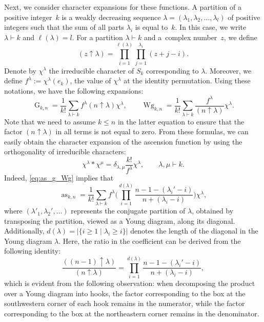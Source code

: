\documentclass[pdftex]{sigma}
\numberwithin{equation}{section}
\theoremstyle{definition}
\DeclareMathOperator{\Raise}{as}
\DeclareMathOperator{\G}{G}
\DeclareMathOperator{\Wg}{Wg}
\begin{document}
Next, we consider character expansions for these functions.
A partition of a positive integer~$k$ is a weakly decreasing sequence
$\lambda=(\lambda_1,\lambda_2,\dots,\lambda_l)$ of positive integers
such that the sum of all parts $\lambda_i$ is equal to~$k$.
In this case, we write $\lambda \vdash k$
and $\ell(\lambda)=l$.
For a partition $\lambda \vdash k$ and a~complex number~$z$, we define
\[
(z\uparrow \lambda)= \prod_{i=1}^{\ell(\lambda)} \prod_{j=1}^{\lambda_i} (z+j-i).
\]
Denote by $\chi^\lambda$ the irreducible character of $S_k$ corresponding to $\lambda$.
Moreover, we define $f^\lambda :=\chi^\lambda(e_k)$,
the value of $\chi^\lambda$ at the identity permutation.
Using these notations, we have the following expansions:
\begin{equation} \label{eq:Wg_char}
 \G_{k,n} = \frac{1}{k!} \sum_{\lambda \vdash k} f^\lambda (n \uparrow \lambda) \chi^\lambda,
\qquad
\Wg_{k,n} = \frac{1}{k!} \sum_{\lambda \vdash k} \frac{f^\lambda}{(n \uparrow \lambda)} \chi^\lambda.
\end{equation}
Note that we need to assume $k \le n$ in the latter equation
to ensure that the factor $(n \uparrow \lambda)$ in all terms is not equal to zero.
From these formulas, we can easily obtain the character expansion of the ascension function by using the orthogonality of irreducible characters:
\[
\chi^\lambda * \chi^\mu = \delta_{\lambda,\mu} \frac{k!}{f^\lambda} \chi^\lambda, \qquad \lambda,\mu \vdash k.
\]
Indeed, \eqref{eq:as_g_Wg} implies that
\begin{equation*} %
 \Raise_{k,n} = \frac{1}{k!} \sum_{\lambda \vdash k} f^\lambda
 \Biggl( \prod_{i=1}^{d(\lambda)} \frac{n-1-(\lambda_i'-i)}{ n+(\lambda_i-i)} \Biggr) \chi^\lambda,
\end{equation*}
where $(\lambda'_1,\lambda_2',\dots)$ represents the conjugate partition of $\lambda$,
obtained by transposing the partition, viewed as a Young diagram, along its diagonal.
Additionally, $d(\lambda)=|\{i \ge 1 \mid \lambda_i \ge i\}|$ denotes the length of the diagonal in the Young diagram $\lambda$.
Here, the ratio in the coefficient can be derived from the following identity:
\[
\frac{((n-1) \uparrow \lambda)}{(n \uparrow \lambda)} =
\prod_{i=1}^{d(\lambda)} \frac{n-1-(\lambda_i'-i)}{ n+(\lambda_i-i)},
\]
which is evident from the following observation: when decomposing the product over a Young diagram into hooks, the factor corresponding to the box at the southwestern corner of each hook remains in the numerator, while the factor corresponding to the box at the northeastern corner remains in the denominator.
\end{document}
